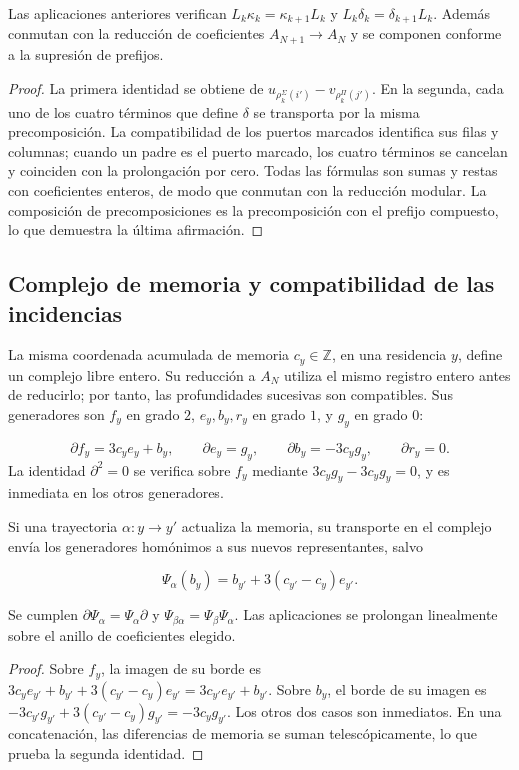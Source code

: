 \begin{proposition}
\label{iv:rectangular-natural}
Las aplicaciones anteriores verifican
\(L_k\kappa_k=\kappa_{k+1}L_k\) y
\(L_k\delta_k=\delta_{k+1}L_k\).
Además conmutan con la reducción de coeficientes
\(A_{N+1}\to A_N\) y se componen conforme a la supresión de prefijos.
\end{proposition}
\begin{proof}
La primera identidad se obtiene de
\(u_{\rho_k^\Sigma(i')}-v_{\rho_k^\Pi(j')}\).
En la segunda, cada uno de los cuatro términos que define \(\delta\)
se transporta por la misma precomposición. La compatibilidad de los
puertos marcados identifica sus filas y columnas; cuando un padre es
el puerto marcado, los cuatro términos se cancelan y coinciden con
la prolongación por cero. Todas las fórmulas son sumas y restas con
coeficientes enteros, de modo que conmutan con la reducción modular.
La composición de precomposiciones es la precomposición con el
prefijo compuesto, lo que demuestra la última afirmación.
\end{proof}

\subsection{Complejo de memoria y compatibilidad de las incidencias}
\label{iv:cont:memoria}
La misma coordenada acumulada de memoria \(c_y\in\mathbb Z\), en una residencia \(y\), define un complejo libre entero. Su reducción a \(A_N\) utiliza el mismo registro entero antes de reducirlo; por tanto, las profundidades sucesivas son compatibles. Sus generadores son \(f_y\) en grado \(2\), \(e_y,b_y,r_y\) en grado \(1\), y \(g_y\) en grado \(0\):

\[
\partial f_y=3c_y e_y+b_y,\qquad
\partial e_y=g_y,\qquad
\partial b_y=-3c_y g_y,\qquad
\partial r_y=0.
\]
La identidad \(\partial^2=0\) se verifica sobre \(f_y\) mediante \(3c_yg_y-3c_yg_y=0\), y es inmediata en los otros generadores.

Si una trayectoria \(\alpha:y\to y'\) actualiza la memoria, su transporte en el complejo envía los generadores homónimos a sus nuevos representantes, salvo

\[
\Psi_\alpha(b_y)=b_{y'}+3(c_{y'}-c_y)e_{y'}.
\]
\begin{proposition}
\label{iv:cont:memoria-natural}
Se cumplen \(\partial\Psi_\alpha=\Psi_\alpha\partial\) y \(\Psi_{\beta\alpha}=\Psi_\beta\Psi_\alpha\). Las aplicaciones se prolongan linealmente sobre el anillo de coeficientes elegido.

\end{proposition}
\begin{proof}
Sobre \(f_y\), la imagen de su borde es \(3c_ye_{y'}+b_{y'}+3(c_{y'}-c_y)e_{y'} =3c_{y'}e_{y'}+b_{y'}\). Sobre \(b_y\), el borde de su imagen es \(-3c_{y'}g_{y'}+3(c_{y'}-c_y)g_{y'}=-3c_yg_{y'}\). Los otros dos casos son inmediatos. En una concatenación, las diferencias de memoria se suman telescópicamente, lo que prueba la segunda identidad.
\end{proof}

